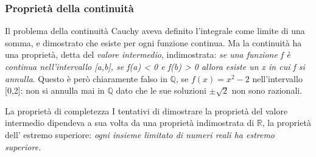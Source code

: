 \begin{frame}[label=Proprietà della continuità]
  \frametitle{Proprietà della continuità}

  \begin{block}{Il problema della continuità}
          Cauchy aveva definito l'integrale come limite di una somma, e dimostrato che esiste per ogni funzione continua.
          Ma la continuità ha una proprietà, detta del \textit{valore intermedio}, indimostrata: 
          \textit{se una funzione f è continua nell'intervallo [a,b],
          se f(a) < 0 e f(b) > 0 allora esiste un x in cui f si annulla}.
          Questo è però chiaramente falso in $\mathbb{Q}$, se $f(x) = x^2 -2$ nell'intervallo [0,2]: non si annulla mai in  
          $\mathbb{Q}$ dato che le sue soluzioni $\pm\sqrt{2}$ non sono razionali.
  \end{block}
  \begin{block}{La proprietà di completezza}
          I tentativi di dimostrare la proprietà del valore intermedio dipendeva a sua volta da una proprietà indimostrata di $\mathbb{R}$,
          la proprietà dell' estremo superiore: \textit{ogni insieme limitato di numeri reali ha estremo superiore}.
  \end{block}
\end{frame}

